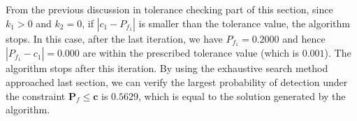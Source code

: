 \newpage

From the previous discussion in tolerance checking part of this section, since $k_1 > 0$ and $k_2 = 0$, if $ |c_1 - P_{f_1}| $ is smaller than the tolerance value, the algorithm stops. In this case, after the last iteration, we have $P_{f_1} = 0.2000$ and hence  $|P_{f_1} - c_1| = 0.000$ are within the prescribed tolerance value (which is $0.001$).  The algorithm stops after this iteration.   By using the exhaustive search method approached last section, we can verify the largest probability of detection under the constraint $\mathbf{P}_f \leq \mathbf{c}$ is $0.5629$, which is equal to the solution generated by the algorithm.
